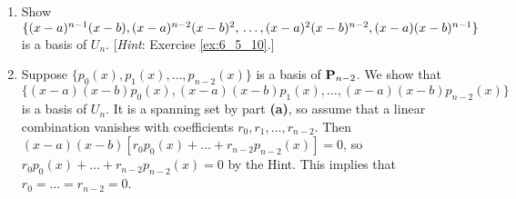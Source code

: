 \begin{multicols}{2}
\begin{ex}
\begin{enumerate}[label={\alph*.}]
[\textit{Hint}: If $p(x)q(x) = 0$ in $\vectspace{P}$, then either $p(x) = 0$, or $q(x) = 0$.]

\item Show $\{(x - a)^{n-1}(x - b), (x - a)^{n-2}(x - b)^{2}, \\ \dots, (x - a)^{2}(x - b)^{n-2}, (x - a)(x - b)^{n-1}\}$ is a basis of $U_{n}$. [\textit{Hint}: Exercise \ref{ex:6_5_10}.]

\end{enumerate}
\begin{sol}
\begin{enumerate}[label={\alph*.}]
\setcounter{enumi}{1}
\item  Suppose $\{p_{0}(x), p_{1}(x), \dots, p_{n-2}(x)\}$ is a basis of $\textbf{P}_{n-2}$. We show that $\{(x - a)(x - b)p_{0}(x), (x - a)(x - b)p_{1}(x), \dots, (x - a)(x - b)p_{n-2}(x)\}$ is a basis of $U_{n}$. It is a spanning set by part \textbf{(a)}, so assume that a linear combination vanishes with coefficients $r_{0}, r_{1}, \dots, r_{n-2}$. Then $(x - a)(x - b)[r_{0}p_{0}(x) + \dots + r_{n-2}p_{n-2}(x)] = 0$, so $r_{0}p_{0}(x) + \dots + r_{n-2}p_{n-2}(x) = 0$ by the Hint. This implies that $r_{0} = \dots = r_{n-2} = 0$.

\end{enumerate}
\end{sol}
\end{ex}
\end{multicols}

